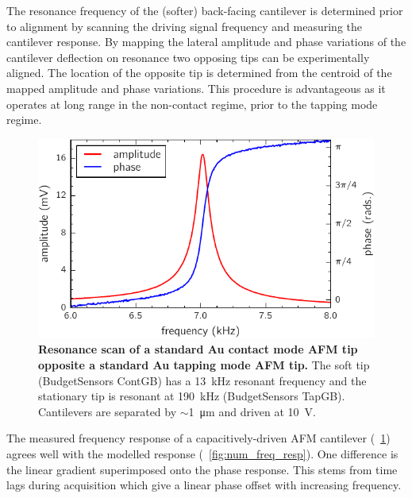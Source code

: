 \documentclass{article}
\begin{document}
The resonance frequency of the {\color{red}(softer) back-facing} cantilever is determined prior to alignment by scanning the driving signal frequency and measuring the cantilever response. By mapping the lateral amplitude and phase variations of the cantilever deflection on resonance two opposing tips can be experimentally aligned. The location of the opposite tip is determined from the centroid of the mapped amplitude and phase variations. This procedure is advantageous as it operates at long range in the non-contact regime, prior to the tapping mode regime.

\begin{figure}[h]
\centering
\includegraphics{figures/exp_resonance_scan}
\caption[Resonance scan of a standard Au contact mode AFM tip opposite a standard Au tapping mode AFM tip]{\textbf{Resonance scan of a standard Au contact mode AFM tip opposite a standard Au tapping mode AFM tip.} The soft tip (BudgetSensors ContGB) has a \SI{13}{kHz} resonant frequency and the stationary tip is resonant at \SI{190}{kHz} (BudgetSensors TapGB). Cantilevers are separated by $\sim$\SI{1}{\micro\metre} and driven at \SI{10}{V}.}
\label{fig:exp_freq_resp}
\end{figure}

The measured frequency response of a capacitively-driven AFM cantilever (\figurename~\ref{fig:exp_freq_resp}) agrees well with the modelled response (\figurename~\ref{fig:num_freq_resp}). One difference is the linear gradient superimposed onto the phase response. This stems from time lags during acquisition which give a linear phase offset with increasing frequency.
\end{document}

